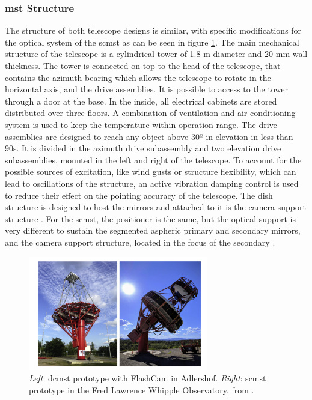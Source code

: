 \documentclass[main.tex]{subfiles}
\begin{document}
\subsubsection{\gls{mst} Structure}

The structure of both telescope designs is similar, with specific modifications for the optical system of the \gls{scmst} \cite{2017SCMSTstatus} as can be seen in figure \ref{fig:2MST}.
The main mechanical structure of the telescope is a cylindrical tower of 1.8 m diameter and 20 mm wall thickness. The tower is connected on top to the head of the telescope, that contains the azimuth bearing which allows the telescope to rotate in the horizontal axis, and the drive assemblies. It is possible to access to the tower through a door at the base. In the inside, all electrical cabinets are stored distributed over three floors. A combination of ventilation and air conditioning system is used to keep the temperature within operation range.
The drive assemblies are designed to reach any object above 30º in elevation in less than 90s. It is divided in the azimuth drive subassembly and two elevation drive subassemblies, mounted in the left and right of the telescope.
To account for the possible sources of excitation, like wind gusts or structure flexibility, which can lead to oscillations of the structure, an active vibration damping control is used to reduce their effect on the pointing accuracy of the telescope.
The dish structure is designed to host the mirrors and attached to it is the camera support structure \cite{2015DCMSTstatus}.
For the \gls{scmst}, the positioner is the same, but the optical support is very different to sustain the segmented aspheric primary and secondary mirrors, and the camera support structure, located in the focus of the secondary \cite{2018MSTandLSTstatus}.


\begin{figure}
\centering
 \includegraphics[width=0.7\textwidth]{Pictures/2MSTpictures.pdf}
  \caption{\textit{Left}: \gls{dcmst} prototype with FlashCam in Adlershof. \textit{Right}: \gls{scmst} prototype in the Fred Lawrence Whipple Observatory, from \cite{2018MSTandLSTstatus}.}
    \label{fig:2MST}
\end{figure}
\end{document}
